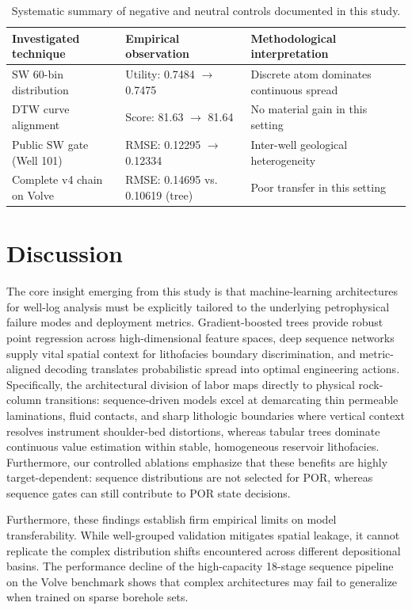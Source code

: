 \documentclass[preprint,12pt,nopreprintline]{elsarticle}
\begin{document}
\begin{table}[t]
\centering
\caption{Systematic summary of negative and neutral controls documented in this study.}
\label{tab:negative}
\footnotesize
\begin{tabular}{>{\raggedright\arraybackslash}p{}>{\raggedright\arraybackslash}p{}>{\raggedright\arraybackslash}p{}}
\toprule
Investigated technique & Empirical observation & Methodological interpretation \\
\midrule
$\mathrm{SW}$ 60-bin distribution & Utility: 0.7484 $\to$ 0.7475 & Discrete atom dominates continuous spread \\
DTW curve alignment & Score: 81.63 $\to$ 81.64 & No material gain in this setting \\
Public $\mathrm{SW}$ gate (Well 101) & RMSE: 0.12295 $\to$ 0.12334 & Inter-well geological heterogeneity \\
Complete v4 chain on Volve & RMSE: 0.14695 vs. 0.10619 (tree) & Poor transfer in this setting \\
\bottomrule
\end{tabular}
\end{table}

\section{Discussion}
\label{sec:discussion}
The core insight emerging from this study is that machine-learning architectures for well-log analysis must be explicitly tailored to the underlying petrophysical failure modes and deployment metrics. Gradient-boosted trees provide robust point regression across high-dimensional feature spaces, deep sequence networks supply vital spatial context for lithofacies boundary discrimination, and metric-aligned decoding translates probabilistic spread into optimal engineering actions. Specifically, the architectural division of labor maps directly to physical rock-column transitions: sequence-driven models excel at demarcating thin permeable laminations, fluid contacts, and sharp lithologic boundaries where vertical context resolves instrument shoulder-bed distortions, whereas tabular trees dominate continuous value estimation within stable, homogeneous reservoir lithofacies. Furthermore, our controlled ablations emphasize that these benefits are highly target-dependent: sequence distributions are not selected for POR, whereas sequence gates can still contribute to POR state decisions.

Furthermore, these findings establish firm empirical limits on model transferability. While well-grouped validation mitigates spatial leakage, it cannot replicate the complex distribution shifts encountered across different depositional basins. The performance decline of the high-capacity 18-stage sequence pipeline on the Volve benchmark shows that complex architectures may fail to generalize when trained on sparse borehole sets.
\end{document}
